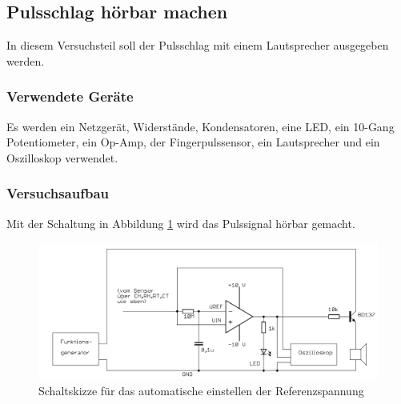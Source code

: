 \documentclass[12pt,a4paper]{article}
\begin{document}
\subsection{Pulsschlag hörbar machen}

In diesem Versuchsteil soll der Pulsschlag mit einem Lautsprecher ausgegeben werden.

\subsubsection*{Verwendete Geräte}

Es werden ein Netzgerät, Widerstände, Kondensatoren, eine LED, ein 10-Gang Potentiometer, ein Op-Amp, der Fingerpulssensor, ein Lautsprecher und ein Oszilloskop verwendet.

\subsubsection*{Versuchsaufbau}

Mit der Schaltung in Abbildung \ref{fig:auf_6} wird das Pulssignal hörbar gemacht.

\begin{figure}[H] 
	\centering
	\includegraphics[scale = 0.3]{auf_6.png}
	\caption[Schaltskizze für das automatische einstellen der Referenzspannung]{Schaltskizze für das automatische einstellen der Referenzspannung\footnotemark}
	\label{fig:auf_6}
\end{figure}
\end{document}
